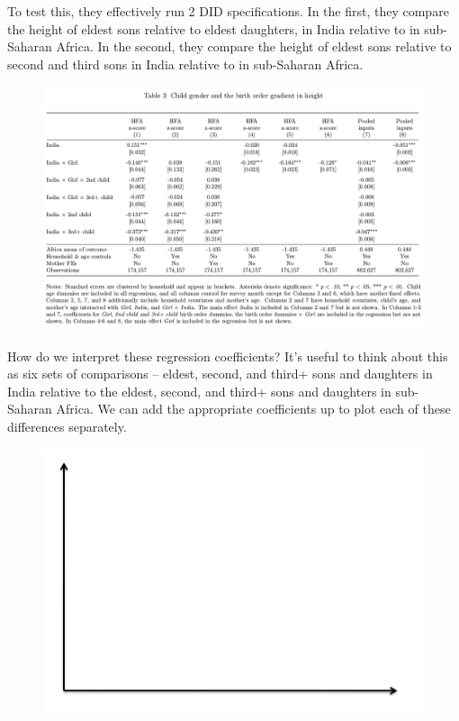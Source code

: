 \documentclass[12pt,english]{article}
\begin{document}
To test this, they effectively run 2 DID specifications. In the first, they compare the height of eldest sons relative to eldest daughters, in India relative to in sub-Saharan Africa. In the second, they compare the height of eldest sons relative to second and third sons in India relative to in sub-Saharan Africa.

\begin{figure}[H]
	\centering
	\begin{adjustbox}{width=\textwidth}
		\includegraphics{fig2.png}
	\end{adjustbox}
\end{figure}

\newpage
How do we interpret these regression coefficients? It's useful to think about this as six sets of comparisons -- eldest, second, and third+ sons and daughters in India relative to the eldest, second, and third+ sons and daughters in sub-Saharan Africa. We can add the appropriate coefficients up to plot each of these differences separately.

\begin{figure}[H]
	\centering
	\begin{adjustbox}{width=\textwidth}
		\includegraphics{axes.png}
	\end{adjustbox}
\end{figure}
\end{document}
